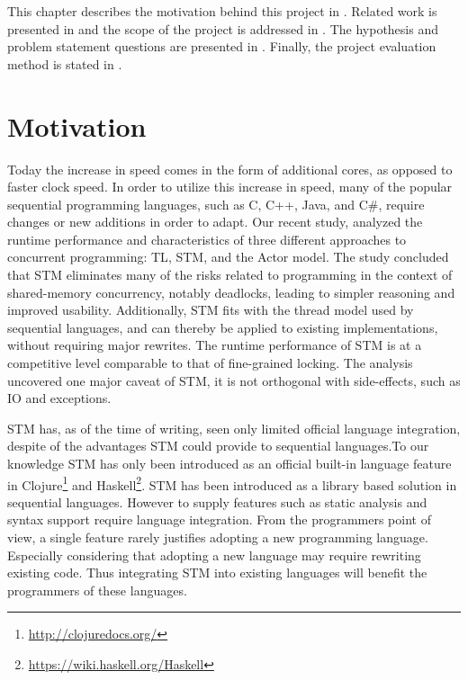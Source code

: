 \makeatletter {}\makeatother
{}
%
This chapter describes the motivation behind this project in . Related work is presented in  and the scope of the project is addressed in . The hypothesis and problem statement questions are presented in . Finally, the project evaluation method is stated in .

\label{chap:introduction}
\section{Motivation}\label{sec:motivation}
Today the increase in  speed comes in the form of additional cores, as opposed to faster clock speed\cite{sutter2005free}. In order to utilize this increase in speed, many of the popular sequential programming languages, such as C, C++, Java, and C\#, require changes or new additions in order to adapt\cite[p. 56]{sutter2005software}. Our recent study\cite{dpt907e14trending}, analyzed the runtime performance and characteristics of three different approaches to concurrent programming: \ac{TL}, \ac{STM}, and the Actor model. The study concluded that \ac{STM} eliminates many of the risks related to programming in the context of shared-memory concurrency, notably deadlocks, leading to simpler reasoning and improved usability. Additionally, \ac{STM} fits with the thread model used by sequential languages, and can thereby be applied to existing implementations, without requiring major rewrites. The runtime performance of \ac{STM} is at a competitive level comparable to that of fine-grained locking\cite{dpt907e14trending}. The analysis uncovered one major caveat of \ac{STM}, it is not orthogonal with side-effects, such as \ac{IO} and exceptions\cite{dpt907e14trending}.

\ac{STM} has, as of the time of writing, seen only limited official language integration, despite of the advantages \ac{STM} could provide to sequential languages.To our knowledge   \ac{STM} has only been introduced as an official built-in language feature in Clojure\footnote{\url{http://clojuredocs.org/}} and Haskell\footnote{\url{https://wiki.haskell.org/Haskell}}. \ac{STM} has been introduced as a library based solution in sequential languages. However to supply features such as static analysis and syntax support require language integration.  From the programmers point of view, a single feature rarely justifies adopting a new programming language. Especially considering that adopting a new language may require rewriting existing code. Thus integrating \ac{STM} into existing languages will benefit the programmers of these languages.

